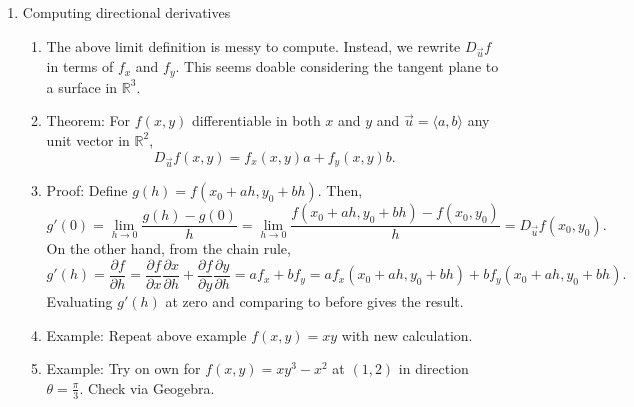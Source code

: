 \documentclass{article}
\begin{document}
\begin{enumerate}
\item Computing directional derivatives
\begin{enumerate}
\item The above limit definition is messy to compute. Instead, we rewrite $D_{\vec{u}} f$ in terms of $f_x$ and $f_y$. This seems doable considering the tangent plane to a surface in $\mathbb{R}^3$.
\item Theorem: For $f(x,y)$ differentiable in both $x$ and $y$ and $\vec{u} = \langle a,b \rangle$ any unit vector in $\mathbb{R}^2$, 
\[
D_{\vec{u}} f(x,y) = f_x(x,y) a + f_y(x,y) b.
\]
\item Proof: Define $g(h) = f(x_0+ah, y_0+bh)$. Then,
\[
g'(0) = \lim_{h \rightarrow 0} \frac{g(h)-g(0)}{h}  = \lim_{h \rightarrow 0} \frac{f(x_0+ah, y_0+bh)-f(x_0,y_0)}{h} =  D_{\vec{u}} f(x_0, y_0).
\]
On the other hand, from the chain rule,
\[
g'(h) = \frac{\partial f}{\partial h} = \frac{\partial f}{\partial x}\frac{\partial x}{\partial h} + \frac{\partial f}{\partial y}\frac{\partial y}{\partial h} = af_x+bf_y= af_x(x_0+ah,y_0+bh)+bf_y(x_0+ah,y_0+bh).
\]
Evaluating $g'(h)$ at zero and comparing to before gives the result.
\item Example: Repeat above example $f(x,y)=xy$ with new calculation.
\item Example: Try on own for $f(x,y)=xy^3-x^2$ at $(1,2)$ in direction $\theta = \frac{\pi}{3}$. Check via Geogebra.
\end{enumerate}


\end{enumerate}
\end{document}
